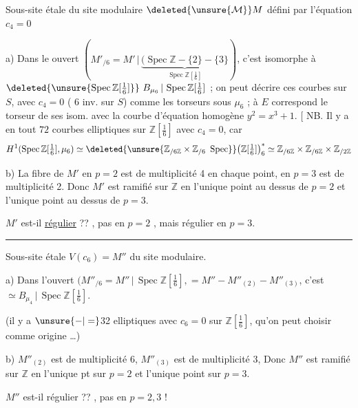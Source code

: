 Sous-site étale  du site modulaire $\deleted{\unsure{\mathcal M}}M$ défini par l'équation $c_4=0$

a) Dans le  ouvert $(M'_{/6}=M'\,|\,\underbrace{(\operatorname{Spec}\mathbb Z-\{2\}-\{3\}}_{\operatorname{Spec}\mathbb Z[\frac16]})$, c'est isomorphe à $\deleted{\unsure{\operatorname{Spec}\mathbb Z[\tfrac16]}}\ B_{\mu_6}\,|\,\operatorname{Spec}\mathbb Z[\tfrac16]$ ; on peut  décrire  ces courbes  sur $S$, avec $c_4=0$ ( $6$ inv. sur $S$) comme les torseurs sous $\mu_6$ ; à $E$ correspond le torseur de ses isom. avec la courbe d'équation  homogène $y^2=x^3+1$. [ NB. Il y a en tout $72$ courbes elliptiques sur $\mathbb Z[\frac16]$ avec $c_4=0$, car
\[
 H^1(\operatorname{Spec}\mathbb Z[\tfrac16],\mu_6)\simeq
 \deleted{\unsure{\mathbb Z_{/6\mathbb Z}\times\mathbb Z_{/6}\ \operatorname{Spec}}}
 \bigl(\mathbb Z[\tfrac16]\bigr)^*_{6}\simeq
 \mathbb Z_{/6\mathbb Z}\times\mathbb Z_{/6\mathbb Z}\times\mathbb Z_{/2\mathbb Z}
\]

b) La fibre de $M'$ en $p=2$ est de  multiplicité 4 en chaque point, en $p=3$ est de multiplicité 2. Donc $M'$ est ramifié sur $\mathbb Z$  en l'unique point au dessus de $p=2$ et l'unique point au dessus de $p=3$.

$M'$ est-il \uline{régulier} ?? , pas en $p=2$ , mais régulier en $p=3$.

\smallskip\noindent\rule{.30\linewidth}{.3pt}

Sous-site étale $V(c_6)=M''$ du site modulaire.

a) Dans l'ouvert $(M''_{/6}=M''\,|\,\operatorname{Spec}\mathbb Z[\tfrac16],=M''-M''_{(2)}-M''_{(3)}$, c'est $\simeq B_{\mu_4}\,|\,\operatorname{Spec}\mathbb Z[\tfrac16]$.

(il y a $\unsure{-|=}$32  elliptiques avec $c_6=0$ sur $\mathbb Z[\frac16]$, qu'on peut choisir comme origine \ldots)

b) $M''_{(2)}$ est de multiplicité 6, $M''_{(3)}$ est de multiplicité 3, Donc $M''$ est ramifié sur $\mathbb Z$  en l'unique pt sur $p=2$ et l'unique point sur $p=3$.

$M''$ est-il régulier ?? , pas en $p=2,3$ !
